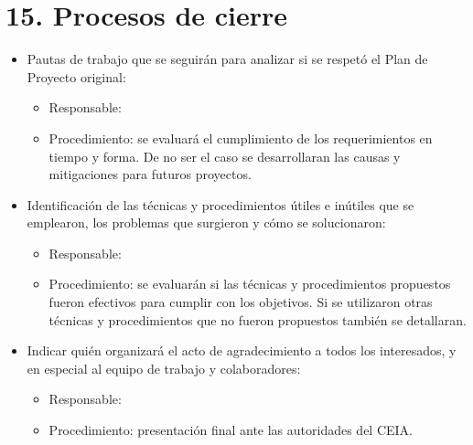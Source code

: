 \documentclass[
    11pt, %
]{charter}
\begin{document}
    \section{15. Procesos de cierre}
    \label{sec:cierre}
    \begin{itemize}
    \item Pautas de trabajo que se seguirán para analizar si se respetó el Plan de Proyecto original:\\

      \begin{itemize}
      \item Responsable: \supname
      \item Procedimiento: se evaluará el cumplimiento de los requerimientos en tiempo y forma. De no ser el caso se desarrollaran las causas y mitigaciones para futuros proyectos.
      \end{itemize}

    \item Identificación de las técnicas y procedimientos útiles e inútiles que se emplearon, los problemas que surgieron y cómo se solucionaron:\\
      \begin{itemize}
      \item Responsable: \supname
      \item Procedimiento: se evaluarán si las técnicas y procedimientos propuestos fueron efectivos para cumplir con los objetivos. Si se utilizaron otras técnicas y procedimientos que no fueron propuestos también se detallaran.
      \end{itemize}

    \item Indicar quién organizará el acto de agradecimiento a todos los interesados, y en especial al equipo de trabajo y colaboradores:\\
      \begin{itemize}
      \item Responsable: \supname
      \item Procedimiento: presentación final ante las autoridades del CEIA.
      \end{itemize}

    \end{itemize}
\end{document}

